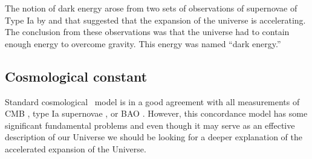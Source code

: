 The notion of dark energy arose from two sets of observations of supernovae of Type Ia by \textcite{riess} and \textcite{1999ApJ...517..565P} that suggested that the expansion of the universe is accelerating. The conclusion from these observations was that the universe had to contain enough energy to overcome gravity. This energy was named “dark energy.”

\subsection{Cosmological constant}



Standard cosmological \LCDM\ model is in a good agreement with all measurements of CMB \parencite{planck_cosm}, type Ia supernovae \parencite{Abbott_2019}, or BAO \parencite{BAO_results}. However, this concordance model has some significant fundamental problems and even though it may serve as an effective description of our Universe we should be looking for a deeper explanation of the accelerated expansion of the Universe.
